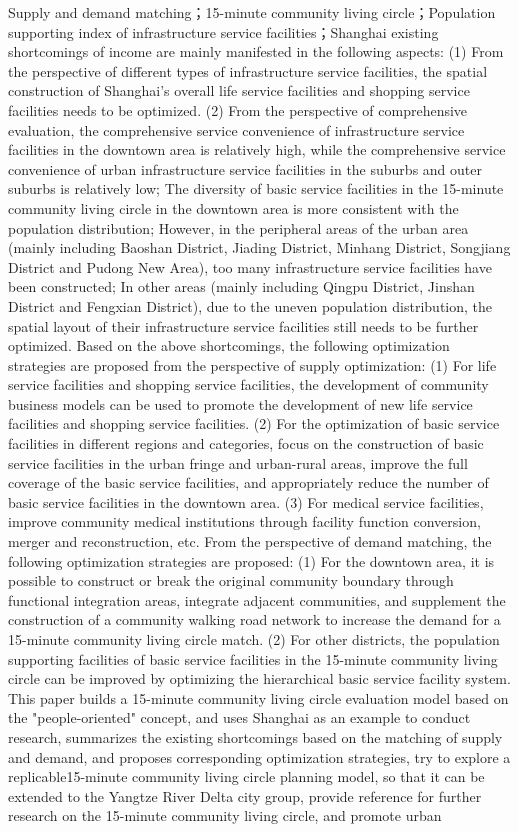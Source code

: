 \documentclass{shnuthesis}
\begin{document}
\begin{enabstract}{Supply and demand matching；15-minute community living circle；Population supporting index of infrastructure service facilities；Shanghai}
existing shortcomings of income are mainly manifested in the following aspects: (1) From the perspective of different types of infrastructure service facilities, the spatial construction of Shanghai's overall life service facilities and shopping service facilities needs to be optimized. (2) From the perspective of comprehensive evaluation, the comprehensive service convenience of infrastructure service facilities in the downtown area is relatively high, while the comprehensive service convenience of urban infrastructure service facilities in the suburbs and outer suburbs is relatively low; The diversity of basic service facilities in the 15-minute community living circle in the downtown area is more consistent with the population distribution; However, in the peripheral areas of the urban area (mainly including Baoshan District, Jiading District, Minhang District, Songjiang District and Pudong New Area), too many infrastructure service facilities have been constructed; In other areas (mainly including Qingpu District, Jinshan District and Fengxian District), due to the uneven population distribution, the spatial layout of their infrastructure service facilities still needs to be further optimized. Based on the above shortcomings, the following optimization strategies are proposed from the perspective of supply optimization: (1) For life service facilities and shopping service facilities, the development of community business models can be used to promote the development of new life service facilities and shopping service facilities. (2) For the optimization of basic service facilities in different regions and categories, focus on the construction of basic service facilities in the urban fringe and urban-rural areas, improve the full coverage of the basic service facilities, and appropriately reduce the number of basic service facilities in the downtown area. (3) For medical service facilities, improve community medical institutions through facility function conversion, merger and reconstruction, etc. From the perspective of demand matching, the following optimization strategies are proposed: (1) For the downtown area, it is possible to construct or break the original community boundary through functional integration areas, integrate adjacent communities, and supplement the construction of a community walking road network to increase the demand for a 15-minute community living circle match. (2) For other districts, the population supporting facilities of basic service facilities in the 15-minute community living circle can be improved by optimizing the hierarchical basic service facility system. This paper builds a 15-minute community living circle evaluation model based on the "people-oriented" concept, and uses Shanghai as an example to conduct research, summarizes the existing shortcomings based on the matching of supply and demand, and proposes corresponding optimization strategies, try to explore a replicable15-minute community living circle planning model, so that it can be extended to the Yangtze River Delta city group, provide reference for further research on the 15-minute community living circle, and promote urban 
\end{enabstract}
\end{document}
